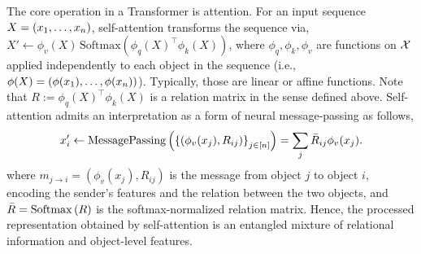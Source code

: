 The core operation in a Transformer is attention. For an input sequence $X = (x_1, \ldots, x_n)$, self-attention transforms the sequence via, $ X' \gets \phi_v(X) \, \mathrm{Softmax}({\phi_q(X)}^\top \phi_k(X))$,
where $\phi_q, \phi_k, \phi_v$ are functions on ${\mathcal{X}}$ applied independently to each object in the sequence (i.e., $\phi(X) = (\phi(x_1), \ldots, \phi(x_n))$). Typically, those are linear or affine functions.
Note that $R := \phi_q(X)^\top \phi_k(X)$ is a relation matrix in the sense defined above. Self-attention admits an interpretation as a form of neural message-passing as follows, 
\begin{equation}\label{eq:self_attn_message_passing}
    x_i' \gets \mathrm{MessagePassing}\left(\left\{(\phi_v(x_j), R_{ij})\right\}_{j \in [n]}\right) = \sum_{j} \bar{R}_{ij} \phi_v(x_j).
\end{equation}
where $m_{j \to i} = (\phi_v(x_j), R_{ij})$ is the message from object $j$ to object $i$, encoding the sender's features and the relation between the two objects, and $\bar{R} = \mathrm{Softmax}\left(R\right)$ is the softmax-normalized relation matrix. Hence, the processed representation obtained by self-attention is an entangled mixture of relational information and object-level features.


